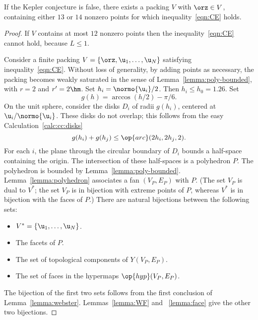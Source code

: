 \begin{lemma}\label{lemma:13-14}  %
If the Kepler conjecture is false, there exists a packing $ V$ with
$\orz\in V$, containing either $13$ or $14$ nonzero points for which
inequality~\ref{eqn:CE} holds.
\end{lemma}


\begin{proof} If $ V$ contains at most $12$ nonzero points then
the inequality~\ref{eqn:CE} cannot hold, because $L\le 1$.

Consider a finite packing $ V=\{\orz, \u_1,\ldots, \u_N\}$ satisfying
inequality~\ref{eqn:CE}.  Without loss of generality, by adding points
as necessary, the packing becomes weakly saturated in the sense of
Lemma~\ref{lemma:poly-bounded}, with $r=2$ and $r'=2\hm$.  Set $h_i =
\normo{ \u_i}/2$.  Then $h_i\le h_0=1.26$.  Set
\begin{displaymath}%
g(h) = \arccos(h/2) - \pi/6.  %
\end{displaymath}%
On the unit sphere, consider the disks $D_i$ of radii $g(h_i)$,
centered at $ \u_i/\normo{ \u_i}$.  These disks do not overlap; this
follows from the easy
Calculation~\ref{calc:cc:disks} %
\begin{displaymath}%
g(h_i) + g(h_j) \le \op{arc}(2h_i,2h_j,2).%
\end{displaymath}%
%
For each $i$, the plane through the circular boundary of $D_i$ bounds
a half-space containing the origin.  The intersection of these
half-spaces is a polyhedron $P$.  The polyhedron is bounded by
Lemma~\ref{lemma:poly-bounded}.  Lemma~\ref{lemma:polyhedron}
associates a fan $(V_P,E_P)$ with $P$.  (The set $V_P$ is dual to $
V^*$; the set $V_P$ is in bijection with extreme points of $P$, whereas $
V^*$ is in bijection with the faces of $P$.)  There are natural
bijections between the following sets:
\begin{itemize}
\item $ V^* = \{ \u_1,\ldots, \u_N\}$.
\item The  facets of $P$.
\item The set of  topological components of $Y(V_P,E_P)$.
\item The set of faces in the hypermaps $\op{hyp}(V_P,E_P)$.
\end{itemize}
The bijection of the first two sets follows from the first conclusion
of Lemma~\ref{lemma:webster}.  Lemmas~\ref{lemma:WF} and
~\ref{lemma:face} give the other two bijections.


\end{proof}
